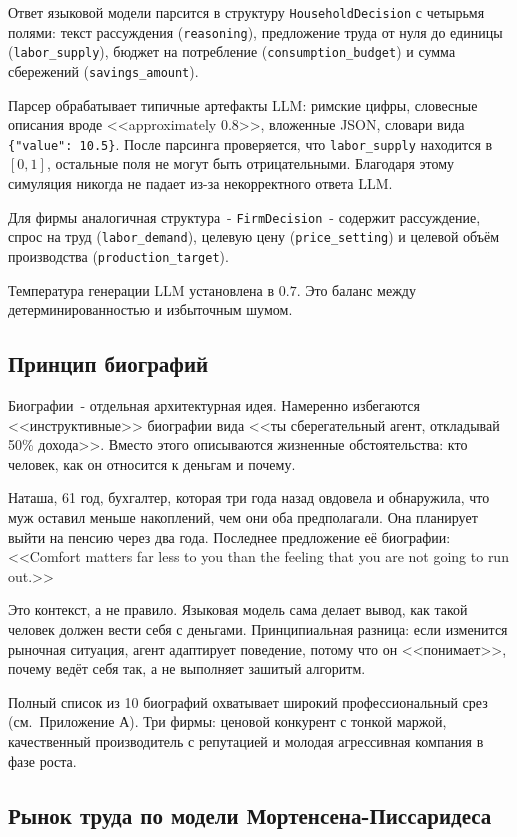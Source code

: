 \documentclass[12pt, a4paper]{article}
\begin{document}
Ответ языковой модели парсится в структуру \texttt{HouseholdDecision} с четырьмя полями: текст рассуждения (\texttt{reasoning}), предложение труда от нуля до единицы (\texttt{labor\_supply}), бюджет на потребление (\texttt{consumption\_budget}) и сумма сбережений (\texttt{savings\_amount}).

Парсер обрабатывает типичные артефакты LLM: римские цифры, словесные описания вроде <<approximately 0.8>>, вложенные JSON, словари вида \texttt{\{"value": 10.5\}}. После парсинга проверяется, что \texttt{labor\_supply} находится в $[0, 1]$, остальные поля не могут быть отрицательными. Благодаря этому симуляция никогда не падает из-за некорректного ответа LLM.

Для фирмы аналогичная структура~- \texttt{FirmDecision}~- содержит рассуждение, спрос на труд (\texttt{labor\_demand}), целевую цену (\texttt{price\_setting}) и целевой объём производства (\texttt{production\_target}).

Температура генерации LLM установлена в $0.7$. Это баланс между детерминированностью и избыточным шумом.

\subsection{Принцип биографий}

Биографии~- отдельная архитектурная идея. Намеренно избегаются <<инструктивные>> биографии вида <<ты сберегательный агент, откладывай 50\% дохода>>. Вместо этого описываются жизненные обстоятельства: кто человек, как он относится к деньгам и почему.

Наташа, 61 год, бухгалтер, которая три года назад овдовела и обнаружила, что муж оставил меньше накоплений, чем они оба предполагали. Она планирует выйти на пенсию через два года. Последнее предложение её биографии: <<Comfort matters far less to you than the feeling that you are not going to run out.>>

Это контекст, а не правило. Языковая модель сама делает вывод, как такой человек должен вести себя с деньгами. Принципиальная разница: если изменится рыночная ситуация, агент адаптирует поведение, потому что он <<понимает>>, почему ведёт себя так, а не выполняет зашитый алгоритм.

Полный список из 10 биографий охватывает широкий профессиональный срез (см.\ Приложение А). Три фирмы: ценовой конкурент с тонкой маржой, качественный производитель с репутацией и молодая агрессивная компания в фазе роста.

\subsection{Рынок труда по модели Мортенсена-Писсаридеса}
\end{document}
